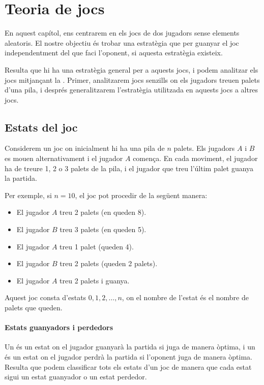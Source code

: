 \chapter{Teoria de jocs}

En aquest capítol, ens centrarem en els jocs de dos jugadors sense
elements aleatoris. El nostre objectiu és trobar una estratègia que
per guanyar el joc independentment del que faci l'oponent, si aquesta
estratègia existeix.

Resulta que hi ha una estratègia general per a aquests jocs, i podem
analitzar els jocs mitjançant la . Primer, analitzarem jocs senzills on els jugadors treuen
palets d'una pila, i després generalitzarem l'estratègia utilitzada en
aquests jocs a altres jocs.

\section{Estats del joc}

Considerem un joc on inicialment hi ha una pila de $n$ palets. Els
jugadors $A$ i $B$ es mouen alternativament i el jugador $A$
comença. En cada moviment, el jugador ha de treure 1, 2 o 3 palets de
la pila, i el jugador que treu l'últim palet guanya la partida.

Per exemple, si $n=10$, el joc pot procedir de la següent manera:
\begin{itemize}[noitemsep]
\item El jugador $A$ treu 2 palets (en queden 8).
\item El jugador $B$ treu 3 palets (en queden 5).
\item El jugador $A$ treu 1 palet (queden 4).
\item El jugador $B$ treu 2 palets (queden 2 palets).
\item El jugador $A$ treu 2 palets i guanya.
\end{itemize}

Aquest joc consta d'estats $0,1,2,\ldots,n$, on el nombre de l'estat
és el nombre de palets que queden.

\subsubsection{Estats guanyadors i perdedors}

 

Un  és un estat on el jugador guanyarà la partida
si juga de manera òptima, i un  és un estat on el
jugador perdrà la partida si l'oponent juga de manera òptima. Resulta
que podem classificar tots els estats d'un joc de manera que cada
estat sigui un estat guanyador o un estat perdedor.

